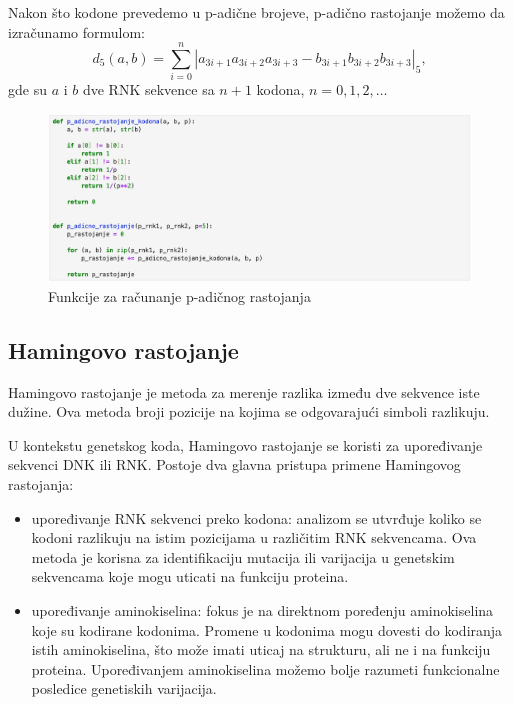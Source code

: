 \documentclass[a4paper,12pt]{article}
\begin{document}
Nakon što kodone prevedemo u p-adične brojeve, p-adično rastojanje možemo da izračunamo formulom:
\[
d_{5}(a, b) = \sum_{i=0}^{n} |a_{3i+1}a_{3i+2}a_{3i+3} - b_{3i+1}b_{3i+2}b_{3i+3}|_{5},
\]
gde su \(a\) i \(b\) dve RNK sekvence sa \(n+1\) kodona, \(n = 0, 1, 2, \ldots \)

\medskip
\begin{figure}[h!]
  \centering
  \includegraphics[width=1\textwidth]{slika10.jpeg}
  \caption{Funkcije za računanje p-adičnog rastojanja}
  \label{fig:my_label}
  \vspace{1cm}
\end{figure}

\newpage
\subsection{Hamingovo rastojanje}
Hamingovo rastojanje je metoda za merenje razlika između dve sekvence iste dužine. Ova metoda broji pozicije na kojima se odgovarajući simboli razlikuju. 

\medskip
U kontekstu genetskog koda, Hamingovo rastojanje se koristi za upoređivanje sekvenci DNK ili RNK. Postoje dva glavna pristupa primene Hamingovog rastojanja:
\begin{itemize}
    \item upoređivanje RNK sekvenci preko kodona: analizom se utvrđuje koliko se kodoni razlikuju na istim pozicijama u različitim RNK sekvencama. Ova metoda je korisna za identifikaciju mutacija ili varijacija u genetskim sekvencama koje mogu uticati na funkciju proteina.
    \item upoređivanje aminokiselina: fokus je na direktnom poređenju aminokiselina koje su kodirane kodonima. Promene u kodonima mogu dovesti do kodiranja istih aminokiselina, što može imati uticaj na strukturu, ali ne i na funkciju proteina. Upoređivanjem aminokiselina možemo bolje razumeti funkcionalne posledice genetiskih varijacija.
\end{itemize}
\end{document}
